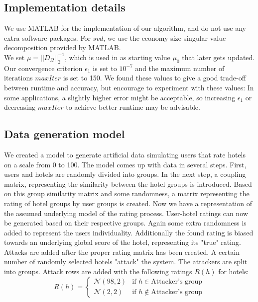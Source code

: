 \documentclass[10pt,conference,compsocconf]{IEEEtran}
\begin{document}
\subsection{Implementation details}

We use MATLAB for the implementation of our algorithm, and do not use any extra software packages.
For $svd$, we use the economy-size singular value decomposition provided by MATLAB. \\

We set $\mu = ||D_{\Omega}||_2^{-1}$, which is used in \cite{almpaper} as starting value $\mu_0$ that later gets updated. \\

Our convergence criterion $\epsilon_1$ is set to $10^{-7}$ and the maximum number of iterations $maxIter$ is set to 150. We found these values to give a good trade-off between runtime and accuracy, but encourage to experiment with these values: In some applications, a slightly higher error might be acceptable, so increasing $\epsilon_1$ or decreasing $maxIter$ to achieve better runtime may be advisable.


\subsection{Data generation model}\label{subsec:datageneration}

We created a model to generate artificial data simulating users that rate hotels on a scale from 0 to 100. The model comes up with data in several steps. First, users and hotels are randomly divided into groups. In the next step, a coupling matrix, representing the similarity between the hotel groups is introduced. Based on this group similarity matrix and some randomness, a matrix representing the rating of hotel groups by user groups is created. Now we have a representation of the assumed underlying model of the rating process. User-hotel ratings can now be generated based on their respective groups. Again some extra randomness is added to represent the users individuality. Additionally the found rating is biased towards an underlying global score of the hotel, representing its "true" rating.\\
Attacks are added after the proper rating matrix has been created. A certain number of randomly selected hotels "attack" the system. The attackers are split into groups. Attack rows are added with the following ratings $R(h)$ for hotels:
\begin{equation*}
R(h) =
\left\{
	\begin{array}{ll}
		\mathcal{N}(98,2)  & \mbox{if } h \in \mbox{Attacker's group} \\
		\mathcal{N}(2,2) & \mbox{if } h \notin \mbox{Attacker's group}
	\end{array}
\right.
\label{eq:}
\end{equation*}
\end{document}
